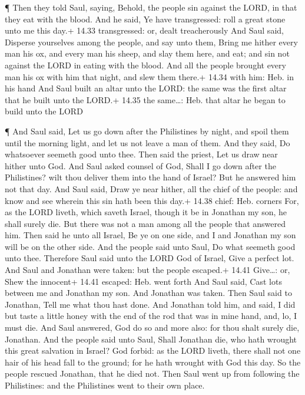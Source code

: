  ¶ Then they told Saul, saying, Behold, the people sin
against the LORD, in that they eat with the blood. And he said, Ye have
transgressed: roll a great stone unto me this day.+ 14.33 transgressed:
or, dealt treacherously  And Saul said, Disperse yourselves
among the people, and say unto them, Bring me hither every man his ox,
and every man his sheep, and slay them here, and eat; and sin not
against the LORD in eating with the blood. And all the people brought
every man his ox with him that night, and slew them there.+ 14.34 with
him: Heb. in his hand  And Saul built an altar unto the
LORD: the same was the first altar that he built unto the LORD.+ 14.35
the same\ldots: Heb. that altar he began to build unto the LORD

 ¶ And Saul said, Let us go down after the Philistines by
night, and spoil them until the morning light, and let us not leave a
man of them. And they said, Do whatsoever seemeth good unto thee. Then
said the priest, Let us draw near hither unto God.  And
Saul asked counsel of God, Shall I go down after the Philistines? wilt
thou deliver them into the hand of Israel? But he answered him not that
day.  And Saul said, Draw ye near hither, all the chief of
the people: and know and see wherein this sin hath been this day.+ 14.38
chief: Heb. corners  For, as the LORD liveth, which saveth
Israel, though it be in Jonathan my son, he shall surely die. But there
was not a man among all the people that answered him.  Then
said he unto all Israel, Be ye on one side, and I and Jonathan my son
will be on the other side. And the people said unto Saul, Do what
seemeth good unto thee.  Therefore Saul said unto the LORD
God of Israel, Give a perfect lot. And Saul and Jonathan were taken: but
the people escaped.+ 14.41 Give\ldots: or, Shew the innocent+ 14.41
escaped: Heb. went forth  And Saul said, Cast lots between
me and Jonathan my son. And Jonathan was taken.  Then Saul
said to Jonathan, Tell me what thou hast done. And Jonathan told him,
and said, I did but taste a little honey with the end of the rod that
was in mine hand, and, lo, I must die.  And Saul answered,
God do so and more also: for thou shalt surely die, Jonathan.
 And the people said unto Saul, Shall Jonathan die, who
hath wrought this great salvation in Israel? God forbid: as the LORD
liveth, there shall not one hair of his head fall to the ground; for he
hath wrought with God this day. So the people rescued Jonathan, that he
died not.  Then Saul went up from following the
Philistines: and the Philistines went to their own place.

